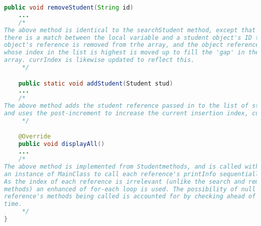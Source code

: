 \documentclass{article}
\begin{document}
\begin{large}
\begin{lstlisting}[language=Java]
	public void removeStudent(String id)
	...
	/*
The above method is identical to the searchStudent method, except that when
there is a match between the local variable and a student object's ID that
object's reference is removed from trhe array, and the object reference 
whose index in the list is highest is moved up to fill the 'gap' in the 
array. currIndex is likewise updated to reflect this.
	 */

	public static void addStudent(Student stud)
	...
	/*
The above method adds the student reference passed in to the list of students
and uses the post-increment to increase the current insertion index, currIndex.
	 */

	@Override
	public void displayAll()
	...
	/*
The above method is implemented from Studentmethods, and is called with 
an instance of MainClass to call each reference's printInfo sequentially.
As the index of each reference is irrelevant (unlike the search and remove
methods) an enhanced of for-each loop is used. The possibility of null 
reference's methods being called is accounted for by checking ahead of 
time.
	 */
}
\end{lstlisting}
\noindent\makebox[\linewidth]{\rule{\paperwidth}{0.4pt}}

\end{large}
\end{document}
